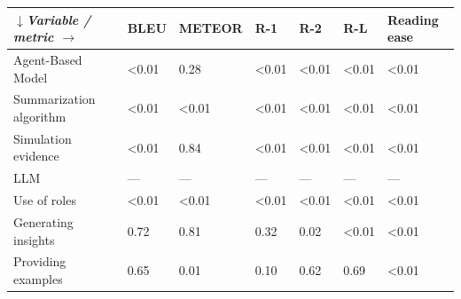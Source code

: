 \begin{tabular}{|l|l|l|l|l|l|l|}
\hline
\textit{$\downarrow$Variable / metric $\rightarrow$} & BLEU & METEOR & R-1 & R-2 & R-L & Reading ease \\
 \hline
 Agent-Based Model & \textless{}0.01 & 0.28 & \textless{}0.01 & \textless{}0.01 & \textless{}0.01 & \textless{}0.01 \\
 \hline
 Summarization algorithm & \textless{}0.01 & \textless{}0.01 & \textless{}0.01 & \textless{}0.01 & \textless{}0.01 & \textless{}0.01 \\
 \hline
 Simulation evidence & \textless{}0.01 & 0.84 & \textless{}0.01 & \textless{}0.01 & \textless{}0.01 & \textless{}0.01 \\
 \hline
 LLM & — & — & — & — & — & — \\
 \hline
 Use of roles & \textless{}0.01 & \textless{}0.01 & \textless{}0.01 & \textless{}0.01 & \textless{}0.01 & \textless{}0.01 \\
 \hline
 Generating insights & 0.72 & 0.81 & 0.32 & 0.02 & \textless{}0.01 & \textless{}0.01 \\
 \hline
 Providing examples & 0.65 & 0.01 & 0.10 & 0.62 & 0.69 & \textless{}0.01 \\
\hline
\end{tabular}
